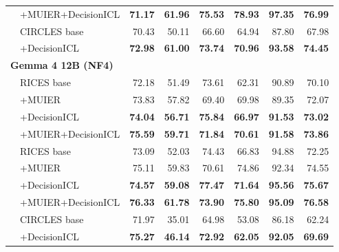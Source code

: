 \begin{tabular}{llrrrrrr}
 & +MUIER+DecisionICL & \textbf{71.17} & \textbf{61.96} & \textbf{75.53} & \textbf{78.93} & \textbf{97.35} & \textbf{76.99} \\
\addlinespace[3pt]
2 & CIRCLES base & 70.43 & 50.11 & 66.60 & 64.94 & 87.80 & 67.98 \\
 & +DecisionICL & \textbf{72.98} & \textbf{61.00} & \textbf{73.74} & \textbf{70.96} & \textbf{93.58} & \textbf{74.45} \\
\midrule
\multicolumn{8}{l}{\textbf{Gemma 4 12B (NF4)}} \\
\addlinespace[2pt]
1 & RICES base & 72.18 & 51.49 & 73.61 & 62.31 & 90.89 & 70.10 \\
 & +MUIER & 73.83 & 57.82 & 69.40 & 69.98 & 89.35 & 72.07 \\
 & +DecisionICL & \textbf{74.04} & \textbf{56.71} & \textbf{75.84} & \textbf{66.97} & \textbf{91.53} & \textbf{73.02} \\
 & +MUIER+DecisionICL & \textbf{75.59} & \textbf{59.71} & \textbf{71.84} & \textbf{70.61} & \textbf{91.58} & \textbf{73.86} \\
\addlinespace[3pt]
2 & RICES base & 73.09 & 52.03 & 74.43 & 66.83 & 94.88 & 72.25 \\
 & +MUIER & 75.11 & 59.83 & 70.61 & 74.86 & 92.34 & 74.55 \\
 & +DecisionICL & \textbf{74.57} & \textbf{59.08} & \textbf{77.47} & \textbf{71.64} & \textbf{95.56} & \textbf{75.67} \\
 & +MUIER+DecisionICL & \textbf{76.33} & \textbf{61.78} & \textbf{73.90} & \textbf{75.80} & \textbf{95.09} & \textbf{76.58} \\
\addlinespace[3pt]
2 & CIRCLES base & 71.97 & 35.01 & 64.98 & 53.08 & 86.18 & 62.24 \\
 & +DecisionICL & \textbf{75.27} & \textbf{46.14} & \textbf{72.92} & \textbf{62.05} & \textbf{92.05} & \textbf{69.69} \\
\bottomrule
\end{tabular}
